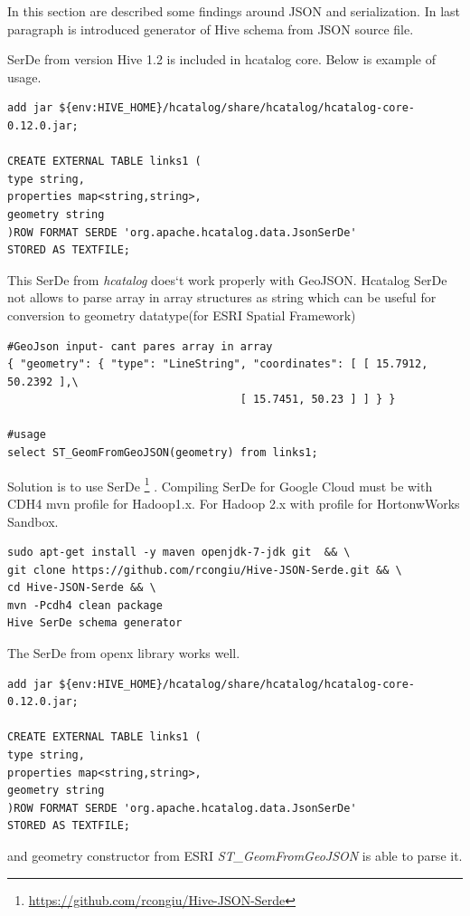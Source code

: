\documentclass[a4paper,12pt,oneside]{report}
\begin{document}
In this section are described some findings around JSON and serialization. In
last paragraph is introduced generator of Hive schema from JSON source file.

SerDe from version Hive 1.2 is included in hcatalog core. Below is example of
usage.
		\begin{footnotesize}
			\begin{lstlisting}[style=python]
add jar ${env:HIVE_HOME}/hcatalog/share/hcatalog/hcatalog-core-0.12.0.jar;

CREATE EXTERNAL TABLE links1 (
type string,
properties map<string,string>,
geometry string
)ROW FORMAT SERDE 'org.apache.hcatalog.data.JsonSerDe'
STORED AS TEXTFILE;
			\end{lstlisting}
		\end{footnotesize}

This SerDe from \textit{hcatalog} does`t work properly with GeoJSON. Hcatalog
SerDe not allows to parse array in array structures as string which can be
useful for conversion to geometry  datatype(for ESRI Spatial Framework)
		\begin{footnotesize}
			\begin{lstlisting}[style=python]
#GeoJson input- cant pares array in array
{ "geometry": { "type": "LineString", "coordinates": [ [ 15.7912, 50.2392 ],\
 				                	[ 15.7451, 50.23 ] ] } }

#usage
select ST_GeomFromGeoJSON(geometry) from links1;
			\end{lstlisting}
		\end{footnotesize}

Solution is to use SerDe
\footnote{\url{https://github.com/rcongiu/Hive-JSON-Serde}} . Compiling SerDe
for Google Cloud must be with CDH4 mvn profile for Hadoop1.x. For Hadoop 2.x
with profile for HortonwWorks Sandbox.
		\begin{footnotesize}
			\begin{lstlisting}[style=python]
sudo apt-get install -y maven openjdk-7-jdk git  && \
git clone https://github.com/rcongiu/Hive-JSON-Serde.git && \
cd Hive-JSON-Serde && \
mvn -Pcdh4 clean package
Hive SerDe schema generator
			\end{lstlisting}
		\end{footnotesize}

The SerDe from openx library works well.
\begin{footnotesize}
			\begin{lstlisting}[style=python]
add jar ${env:HIVE_HOME}/hcatalog/share/hcatalog/hcatalog-core-0.12.0.jar;

CREATE EXTERNAL TABLE links1 (
type string,
properties map<string,string>,
geometry string
)ROW FORMAT SERDE 'org.apache.hcatalog.data.JsonSerDe'
STORED AS TEXTFILE;
			\end{lstlisting}
\end{footnotesize}
and geometry constructor from ESRI \textit{ST\_GeomFromGeoJSON} is able to parse it.
\end{document}
